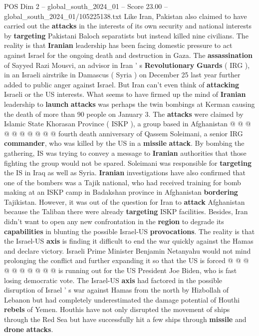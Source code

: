 \begin{textsample}{POS Dim 2 – global\_south\_2024\_01 – Score 23.00 – global\_south\_2024\_01/105225138.txt}
Like Iran, Pakistan also claimed to have carried out the \textbf{attacks} in the interests of its own security and national interests by \textbf{targeting} Pakistani Baloch separatists but instead killed nine civilians.
The reality is that \textbf{Iranian} leadership has been facing domestic pressure to act against Israel for the ongoing death and destruction in Gaza.
The \textbf{assassination} of Sayyed Razi Mousvi, an advisor in Iran ' s \textbf{Revolutionary} \textbf{Guards} ( IRG ), in an Israeli airstrike in Damascus ( Syria ) on December 25 last year further added to public anger against Israel.
But Iran can't even think of \textbf{attacking} Israeli or the US interests.
What seems to have firmed up the mind of \textbf{Iranian} leadership to \textbf{launch} \textbf{attacks} was perhaps the twin bombings at Kerman causing the death of more than 90 people on January 3.
The \textbf{attacks} were claimed by Islamic State Khorasan Province ( ISKP ), a group based in Afghanistan @ @ @ @ @ @ @ @ @ @ fourth death anniversary of Qassem Soleimani, a senior IRG \textbf{commander}, who was killed by the US in a \textbf{missile} \textbf{attack}.
By bombing the gathering, IS was trying to convey a message to \textbf{Iranian} authorities that those fighting the group would not be spared.
Soleimani was responsible for \textbf{targeting} the IS in Iraq as well as Syria. \textbf{Iranian} investigations have also confirmed that one of the bombers was a Tajik national, who had received training for bomb making at an ISKP camp in Badakshan province in Afghanistan \textbf{bordering} Tajikistan.
However, it was out of the question for Iran to \textbf{attack} Afghanistan because the Taliban there were already \textbf{targeting} ISKP facilities.
Besides, Iran didn't want to open any new confrontation in the \textbf{region} to degrade its \textbf{capabilities} in blunting the possible Israel-US \textbf{provocations}.
The reality is that the Israel-US \textbf{axis} is finding it difficult to end the war quickly against the Hamas and declare victory.
Israeli Prime Minister Benjamin Netanyahu would not mind prolonging the conflict and further expanding it so that the US is forced @ @ @ @ @ @ @ @ @ @ is running out for the US President Joe Biden, who is fast losing democratic vote.
The Israel-US \textbf{axis} had factored in the possible disruption of Israel ' s war against Hamas from the north by Hizbollah of Lebanon but had completely underestimated the damage potential of Houthi \textbf{rebels} of Yemen.
Houthis have not only disrupted the movement of ships through the Red Sea but have successfully hit a few ships through \textbf{missile} and \textbf{drone} \textbf{attacks}.

\end{textsample}
